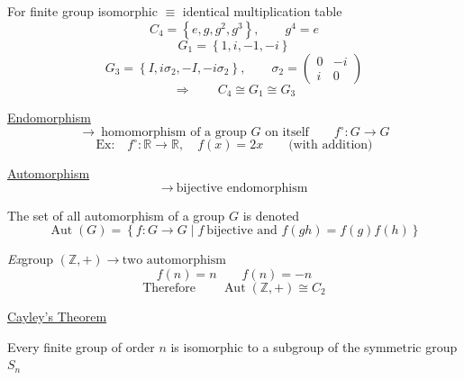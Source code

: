 \documentclass[a4paper,11pt]{article}
\begin{document}
For finite group isomorphic $\equiv$ identical multiplication table
\[
C_4=\left\{e,g,g^2,g^3\right\},\qquad g^4=e
\]
\[
G_1=\left\{1,i,-1,-i\right\}
\]
\[
G_3=\left\{I,i\sigma_2,-I,-i\sigma_2\right\},
\qquad
\sigma_2=\left(\begin{array}{cc}0&-i\\i&0\end{array}\right)
\]
\[
\Longrightarrow\qquad C_4\cong G_1\cong G_3
\]

\underline{Endomorphism}
\[
\longrightarrow\ \text{homomorphism of a group }G\text{ on itself}
\qquad f^\circ:G\longrightarrow G
\]
\[
\text{Ex:}\quad f^\circ:\mathbb{R}\longrightarrow\mathbb{R},\quad f(x)=2x
\qquad\text{(with addition)}
\]

\vspace{0.8em}
\underline{Automorphism}
\[
\longrightarrow\ \text{bijective endomorphism}
\]

The set of all automorphism of a group $G$ is denoted
\[
\operatorname{Aut}(G)=\left\{f:G\longrightarrow G\mid f\ \text{bijective and }f(gh)=f(g)f(h)\right\}
\]

\textit{Ex}\quad group $(\mathbb{Z},+)$\quad $\longrightarrow\ \text{two automorphism}$
\[
f(n)=n
\qquad
f(n)=-n
\]
\[
\text{Therefore}\qquad \operatorname{Aut}(\mathbb{Z},+)\cong C_2
\]

\vspace{0.8em}
\underline{Cayley's Theorem}

Every finite group of order $n$ is isomorphic to a subgroup of the
symmetric group $S_n$
\end{document}
